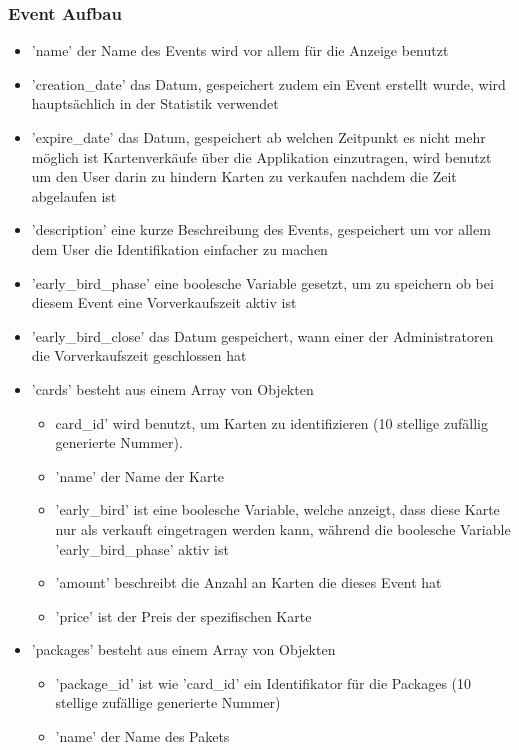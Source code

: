 			\subsubsection{Event Aufbau}			
				\begin{itemize}
					\item 'name' der Name des Events wird vor allem für die Anzeige benutzt
					\item 'creation\_date' das Datum, gespeichert zudem ein Event erstellt wurde, wird hauptsächlich in der Statistik verwendet
					\item 'expire\_date' das Datum, gespeichert ab welchen Zeitpunkt es nicht mehr möglich ist Kartenverkäufe über die Applikation einzutragen, wird benutzt um den User darin zu hindern Karten zu verkaufen nachdem die Zeit abgelaufen ist
					\item 'description' eine kurze Beschreibung des Events, gespeichert um vor allem dem User die Identifikation einfacher zu machen
					\item 'early\_bird\_phase' eine boolesche Variable gesetzt, um zu speichern ob bei diesem Event eine Vorverkaufszeit aktiv ist
					\item 'early\_bird\_close' das Datum gespeichert, wann einer der Administratoren die Vorverkaufszeit geschlossen hat
					\item 'cards' besteht aus einem Array von Objekten
					\begin{itemize}
						\item card\_id' wird benutzt, um Karten zu identifizieren (10 stellige zufällig generierte Nummer). 
						\item 'name' der Name der Karte
						\item 'early\_bird' ist eine boolesche Variable, welche anzeigt, dass diese Karte nur als verkauft eingetragen werden kann, während die boolesche Variable 'early\_bird\_phase' aktiv ist
						\item 'amount' beschreibt die Anzahl an Karten die dieses Event hat
						\item 'price' ist der Preis der spezifischen Karte
					\end{itemize}
					\item 'packages' besteht aus einem Array von Objekten
					\begin{itemize}
						\item 'package\_id' ist wie 'card\_id' ein Identifikator für die Packages (10 stellige zufällige generierte Nummer)
						\item 'name' der Name des Pakets

\end{itemize}
\end{itemize}
